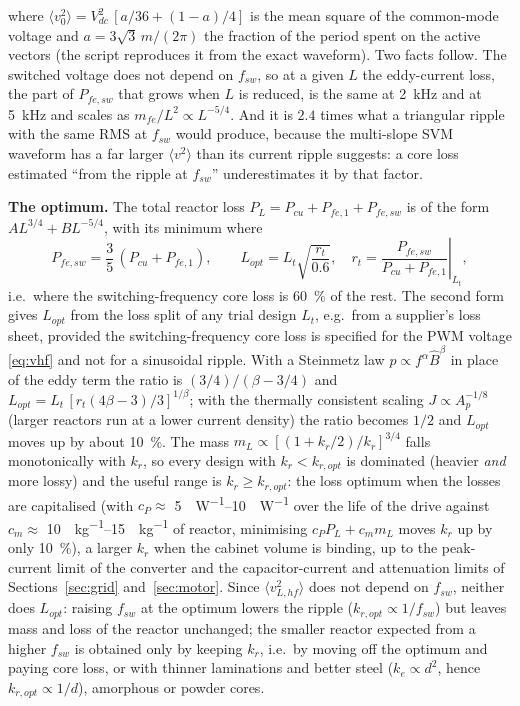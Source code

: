 \documentclass[10pt,a4paper]{scrartcl}
\newcommand{\Vdc}{V_{dc}}
\newcommand{\fsw}{f_{sw}}
\begin{document}
\begin{onehalfspace}
\begin{equation}
\label{eq:vhf}
\end{equation}
where $\langle v_0^2\rangle = \Vdc^2\,[a/36 + (1 - a)/4]$ is the mean square of the common-mode voltage and $a = 3\sqrt3\,m/(2\pi)$ the fraction of the period spent on the active vectors (the script reproduces it from the exact waveform). Two facts follow. The switched voltage does not depend on $\fsw$, so at a given $L$ the eddy-current loss, the part of $P_{fe,sw}$ that grows when $L$ is reduced, is the same at \SI{2}{kHz} and at \SI{5}{kHz} and scales as $m_{fe}/L^2 \propto L^{-5/4}$. And it is $2.4$ times what a triangular ripple with the same RMS at $\fsw$ would produce, because the multi-slope SVM waveform has a far larger $\langle v^2\rangle$ than its current ripple suggests: a core loss estimated ``from the ripple at $\fsw$'' underestimates it by that factor.

\textbf{The optimum.} The total reactor loss $P_L = P_{cu} + P_{fe,1} + P_{fe,sw}$ is of the form $A L^{3/4} + B L^{-5/4}$, with its minimum where
\begin{equation}
P_{fe,sw} = \frac35\,(P_{cu} + P_{fe,1}),\qquad
L_{opt} = L_t\sqrt{\frac{r_t}{0.6}},\quad r_t = \left.\frac{P_{fe,sw}}{P_{cu} + P_{fe,1}}\right|_{L_t},
\label{eq:Lopt}
\end{equation}
i.e.\ where the switching-frequency core loss is \SI{60}{\percent} of the rest. The second form gives $L_{opt}$ from the loss split of any trial design $L_t$, e.g.\ from a supplier's loss sheet, provided the switching-frequency core loss is specified for the PWM voltage \eqref{eq:vhf} and not for a sinusoidal ripple. With a Steinmetz law $p \propto f^\alpha \hat B^\beta$ in place of the eddy term the ratio is $(3/4)/(\beta - 3/4)$ and $L_{opt} = L_t\,[r_t(4\beta - 3)/3]^{1/\beta}$; with the thermally consistent scaling $J \propto A_p^{-1/8}$ (larger reactors run at a lower current density) the ratio becomes $1/2$ and $L_{opt}$ moves up by about \SI{10}{\percent}. The mass $m_L \propto [(1 + k_r/2)/k_r]^{3/4}$ falls monotonically with $k_r$, so every design with $k_r < k_{r,opt}$ is dominated (heavier \emph{and} more lossy) and the useful range is $k_r \ge k_{r,opt}$: the loss optimum when the losses are capitalised (with $c_P \approx$ \SIrange{5}{10}{\EUR\per W} over the life of the drive against $c_m \approx$ \SIrange{10}{15}{\EUR\per kg} of reactor, minimising $c_P P_L + c_m m_L$ moves $k_r$ up by only \SI{10}{\percent}), a larger $k_r$ when the cabinet volume is binding, up to the peak-current limit of the converter and the capacitor-current and attenuation limits of Sections~\ref{sec:grid} and~\ref{sec:motor}. Since $\langle v_{L,hf}^2\rangle$ does not depend on $\fsw$, neither does $L_{opt}$: raising $\fsw$ at the optimum lowers the ripple ($k_{r,opt} \propto 1/\fsw$) but leaves mass and loss of the reactor unchanged; the smaller reactor expected from a higher $\fsw$ is obtained only by keeping $k_r$, i.e.\ by moving off the optimum and paying core loss, or with thinner laminations and better steel ($k_e \propto d^2$, hence $k_{r,opt} \propto 1/d$), amorphous or powder cores.


\end{onehalfspace}
\end{document}
